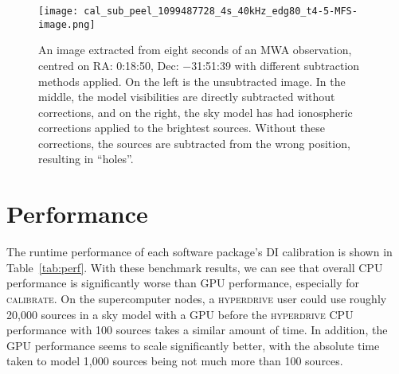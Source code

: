 \documentclass[summary]{ursi}
\newcommand{\hyperdrive}{\textsc{hyperdrive}}\newcommand{\mwalib}{\textsc{mwalib}}
\newcommand{\calibrate}{\textsc{calibrate}}
\begin{document}
\begin{figure*}
    \centering
    \texttt{[image: cal\_sub\_peel\_1099487728\_4s\_40kHz\_edg80\_t4-5-MFS-image.png]}
    \caption{An image extracted from eight seconds of an MWA observation, centred on RA: 0:18:50, Dec: $-$31:51:39 with different subtraction methods applied. On the left is the unsubtracted image. In the middle, the model visibilities are directly subtracted without corrections, and on the right, the sky model has had ionospheric corrections applied to the brightest sources. Without these corrections, the sources are subtracted from the wrong position, resulting in ``holes''.}
    \label{fig:cal_sub_peel}
\end{figure*}

\section{Performance}
The runtime performance of each software package's DI calibration is shown
in Table~\ref{tab:perf}. With these benchmark results, we can see that overall
CPU performance is significantly worse than GPU performance, especially for
\calibrate{}. On the supercomputer nodes, a \hyperdrive{} user could use
roughly 20,000 sources in a sky model with a GPU before the \hyperdrive{} CPU
performance with 100 sources takes a similar amount of time. In addition, the
GPU performance seems to scale significantly better, with the absolute time
taken to model 1,000 sources being not much more than 100 sources. 
\end{document}
